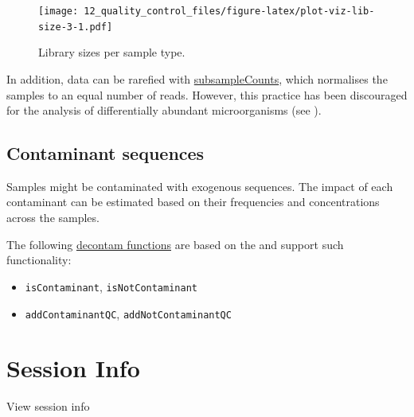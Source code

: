 \documentclass[
]{book}
\providecommand{\tightlist}{%
  \setlength{\itemsep}{0pt}\setlength{\parskip}{0pt}}
\begin{document}
\begin{figure}
\centering
\texttt{[image: 12\_quality\_control\_files/figure-latex/plot-viz-lib-size-3-1.pdf]}
\caption{\label{fig:plot-viz-lib-size-3}Library sizes per sample type.}
\end{figure}

In addition, data can be rarefied with
\href{https://microbiome.github.io/mia/reference/subsampleCounts.html}{subsampleCounts},
which normalises the samples to an equal number of reads. However,
this practice has been discouraged for the analysis of differentially
abundant microorganisms (see \citep{mcmurdie2014waste}).

\hypertarget{contaminant-sequences}{%
\subsection{Contaminant sequences}\label{contaminant-sequences}}

Samples might be contaminated with exogenous sequences. The impact of
each contaminant can be estimated based on their frequencies and
concentrations across the samples.

The following \href{https://microbiome.github.io/mia/reference/isContaminant.html}{decontam
functions}
are based on the \citep{davis2018simple} and support such functionality:

\begin{itemize}
\tightlist
\item
  \texttt{isContaminant}, \texttt{isNotContaminant}
\item
  \texttt{addContaminantQC}, \texttt{addNotContaminantQC}
\end{itemize}

\hypertarget{session-info-2}{%
\section*{Session Info}\label{session-info-2}}

View session info
\end{document}
